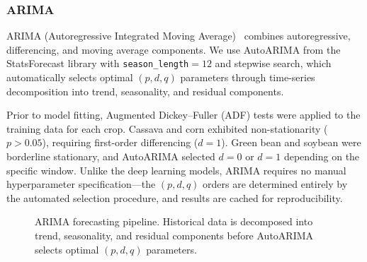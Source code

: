 \documentclass[journal]{IEEEtran}
\begin{document}
\subsubsection{ARIMA}

ARIMA (Autoregressive Integrated Moving Average)~\cite{boxjenkins} combines autoregressive, differencing, and moving average components. We use AutoARIMA from the StatsForecast library with \texttt{season\_length}$= 12$ and stepwise search, which automatically selects optimal $(p, d, q)$ parameters through time-series decomposition into trend, seasonality, and residual components.

Prior to model fitting, Augmented Dickey--Fuller (ADF) tests were applied to the training data for each crop. Cassava and corn exhibited non-stationarity ($p > 0.05$), requiring first-order differencing ($d = 1$). Green bean and soybean were borderline stationary, and AutoARIMA selected $d = 0$ or $d = 1$ depending on the specific window. Unlike the deep learning models, ARIMA requires no manual hyperparameter specification---the $(p, d, q)$ orders are determined entirely by the automated selection procedure, and results are cached for reproducibility.

\begin{figure}[htbp]
  \centering
  \caption{ARIMA forecasting pipeline. Historical data is decomposed into trend, seasonality, and residual components before AutoARIMA selects optimal $(p,d,q)$ parameters.}
  \label{fig:arima}
\end{figure}
\end{document}
